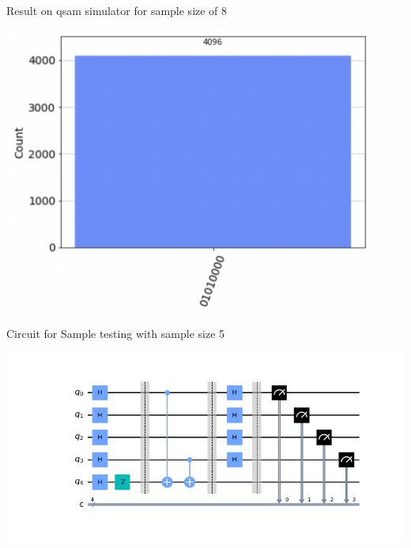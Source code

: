 \documentclass{beamer} %
\begin{document}
	\begin{frame}
		\begin{block}{Result on qsam simulator for sample size of 8}
			
		\end{block}
		\begin{center}
			\includegraphics[scale = 0.5]{Figures/histogram-8.png}
		\end{center}
	\end{frame}
		\begin{frame}
			\begin{block}{Circuit for Sample testing with sample size 5}
				
			\end{block}
			\begin{center}
				\includegraphics[scale = 0.4]{Figures/circuit-5 qubit.png}
			\end{center}
		\end{frame}
\end{document}
